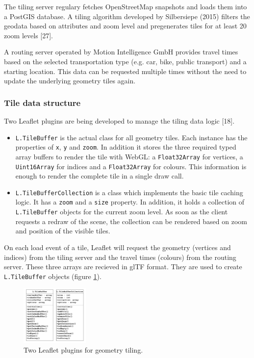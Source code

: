 \documentclass{motivation}
\begin{document}
  The tiling server regulary fetches OpenStreetMap snapshots and loads them into a PostGIS database. A tiling algorithm developed by Silbersiepe (2015) filters the geodata based on attributes and zoom level and pregenerates tiles for at least 20 zoom levels [27].\par
  A routing server operated by Motion Intelligence GmbH provides travel times based on the selected transportation type (e.g. car, bike, public transport) and a starting location. This data can be requested multiple times without the need to update the underlying geometry tiles again.

\subsubsection{Tile data structure}
  \label{sec:tile}
  Two Leaflet plugins are being developed to manage the tiling data logic [18].\par
  \begin{itemize}
    \item \texttt{L.TileBuffer} is the actual class for all geometry tiles. Each instance has the properties of \texttt{x}, \texttt{y} and \texttt{zoom}. In addition it stores the three required typed array buffers to render the tile with WebGL: a \texttt{Float32Array} for vertices, a \texttt{Uint16Array} for indices and a \texttt{Float32Array} for colours. This information is enough to render the complete tile in a single draw call.
    \item \texttt{L.TileBufferCollection} is a class which implements the basic tile caching logic. It has a \texttt{zoom} and a \texttt{size} property. In addition, it holds a collection of \texttt{L.Tile\-Buffer} objects for the current zoom level. As soon as the client requests a redraw of the scene, the collection can be rendered based on zoom and position of the visible tiles.
  \end{itemize}
  On each load event of a tile, Leaflet will request the geometry (vertices and indices) from the tiling server and the travel times (colours) from the routing server. These three arrays are recieved in glTF format. They are used to create \texttt{L.TileBuffer} objects (figure \ref{fig:tbuff}).

  \begin{figure}[h]
    \centering
    \includegraphics[width=0.3\textwidth]{../pdf/classes.pdf}
    \caption{Two Leaflet plugins for geometry tiling.}
    \label{fig:tbuff}
  \end{figure}
\end{document}

